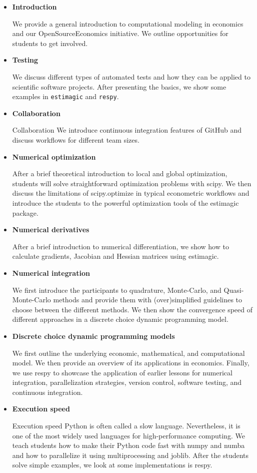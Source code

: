 \begin{itemize}

\item \textbf{Introduction}

We provide a general introduction to computational modeling in economics and our OpenSourceEconomics initiative. We outline opportunities for students to get involved.

\item \textbf{Testing}

We discuss different types of automated tests and how they can be applied to scientific software projects. After presenting the basics, we show some examples in \verb+estimagic+ and \verb+respy+.

\item \textbf{Collaboration}

Collaboration We introduce continuous integration features of GitHub and discuss workflows for different team sizes.

\item \textbf{Numerical optimization}

After a brief theoretical introduction to local and global optimization, students will solve straightforward optimization problems with scipy. We then discuss the limitations of scipy.optimize in typical econometric workflows and introduce the students to the powerful optimization tools of the estimagic package.

\item \textbf{Numerical derivatives}

After a brief introduction to numerical differentiation, we show how to calculate gradients, Jacobian and Hessian matrices using estimagic.

\item \textbf{Numerical integration}

We first introduce the participants to quadrature, Monte-Carlo, and Quasi-Monte-Carlo methods and provide them with (over)simplified guidelines to choose between the different methods. We then show the convergence speed of different approaches in a discrete choice dynamic programming model.

\item \textbf{Discrete choice dynamic programming models}

We first outline the underlying economic, mathematical, and computational model. We then provide an overview of its applications in economics. Finally, we use respy to showcase the application of earlier lessons for numerical integration, parallelization strategies, version control, software testing, and continuous integration.

\item \textbf{Execution speed}

Execution speed Python is often called a slow language. Nevertheless, it is one of the most widely used languages for high-performance computing. We teach students how to make their Python code fast with numpy and numba and how to parallelize it using multiprocessing and joblib. After the students solve simple examples, we look at some implementations is respy.

\end{itemize}

\clearpage


\nocite{Gabler.2019}


